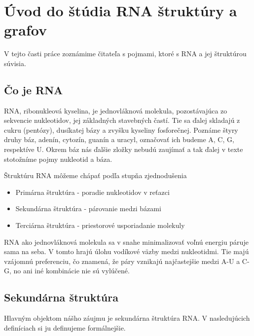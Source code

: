 \renewcommand{\SS}{\mathbb{S}}
\newcommand{\Par}[2]{\mbox{$( #1, #2 )$}}
\usetikzlibrary{positioning, shapes, trees, graphs} %
\newcommand{\scale}{0.6}

\newcommand{\tree}[1]{\ensuremath{#1}}

\chapter{Úvod do štúdia RNA štruktúry a grafov}

V tejto časti práce zoznámime čitateľa s pojmami, ktoré s RNA a jej
štruktúrou súvisia.

\section{Čo je RNA}

RNA, ribonukleová kyselina, je jednovláknová molekula, pozostávajúca
zo sekvencie nukleotidov, jej základných stavebných častí.
Tie sa ďalej skladajú z cukru (pentózy), dusíkatej bázy a zvyšku
kyseliny fosforečnej. Poznáme štyry druhy báz,
adenín, cytozín, guanín a uracyl, označovať ich budeme A, C, G, respektíve U.
Okrem báz nás ďalšie zložky nebudú zaujímať a tak ďalej v texte stotožníme
pojmy nukleotid a báza.

Štruktúru RNA môžeme chápať podľa stupňa zjednodušenia
\begin{itemize}
  \item Primárna štruktúra - poradie nukleotidov v reťazci
  \item Sekundárna štruktúra - párovanie medzi bázami
  \item Terciárna štruktúra - priestorové usporiadanie molekuly
\end{itemize}

RNA ako jednovláknová molekula sa v snahe minimalizovať voľnú energiu páruje sama na seba.
V tomto hrajú úlohu vodíkové väzby medzi nukleotidmi. Tie majú vzájomnú preferenciu,
čo znamená, že páry vznikajú najčastejšie medzi A-U a C-G, no ani iné
kombinácie nie sú vylúčené. 

\section{Sekundárna štruktúra}

Hlavným objektom nášho záujmu je sekundárna štruktúra RNA. V nasledujúcich
definíciach si ju definujeme formálnejšie.

